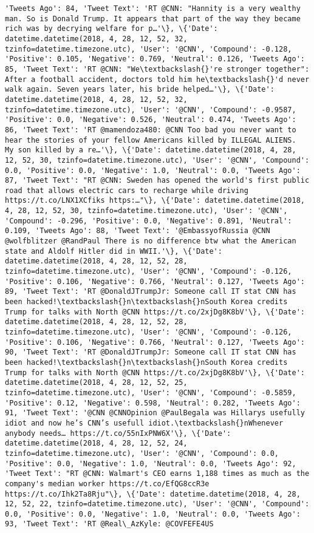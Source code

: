 \documentclass[11pt]{article}
\begin{document}
\begin{Verbatim}[commandchars=\\\{\}]
'Tweets Ago': 84, 'Tweet Text': 'RT @CNN: "Hannity is a very wealthy man. So is Donald Trump. It appears that part of the way they became rich was by decrying welfare for p…'\}, \{'Date': datetime.datetime(2018, 4, 28, 12, 52, 32, tzinfo=datetime.timezone.utc), 'User': '@CNN', 'Compound': -0.128, 'Positive': 0.105, 'Negative': 0.769, 'Neutral': 0.126, 'Tweets Ago': 85, 'Tweet Text': 'RT @CNN: "We\textbackslash{}'re stronger together": After a football accident, doctors told him he\textbackslash{}'d never walk again. Seven years later, his bride helped…'\}, \{'Date': datetime.datetime(2018, 4, 28, 12, 52, 32, tzinfo=datetime.timezone.utc), 'User': '@CNN', 'Compound': -0.9587, 'Positive': 0.0, 'Negative': 0.526, 'Neutral': 0.474, 'Tweets Ago': 86, 'Tweet Text': 'RT @mamendoza480: @CNN Too bad you never want to hear the stories of your fellow Americans killed by ILLEGAL ALIENS.  My son killed by a re…'\}, \{'Date': datetime.datetime(2018, 4, 28, 12, 52, 30, tzinfo=datetime.timezone.utc), 'User': '@CNN', 'Compound': 0.0, 'Positive': 0.0, 'Negative': 1.0, 'Neutral': 0.0, 'Tweets Ago': 87, 'Tweet Text': "RT @CNN: Sweden has opened the world's first public road that allows electric cars to recharge while driving https://t.co/LNX1XCfiks https:…"\}, \{'Date': datetime.datetime(2018, 4, 28, 12, 52, 30, tzinfo=datetime.timezone.utc), 'User': '@CNN', 'Compound': -0.296, 'Positive': 0.0, 'Negative': 0.891, 'Neutral': 0.109, 'Tweets Ago': 88, 'Tweet Text': '@EmbassyofRussia @CNN @wolfblitzer @RandPaul There is no difference btw what the American state and Aldolf Hitler did in WWII.'\}, \{'Date': datetime.datetime(2018, 4, 28, 12, 52, 28, tzinfo=datetime.timezone.utc), 'User': '@CNN', 'Compound': -0.126, 'Positive': 0.106, 'Negative': 0.766, 'Neutral': 0.127, 'Tweets Ago': 89, 'Tweet Text': 'RT @DonaldJTrumpJr: Someone call IT stat CNN has been hacked!\textbackslash{}n\textbackslash{}nSouth Korea credits Trump for talks with North @CNN https://t.co/2xjDg8K8bV'\}, \{'Date': datetime.datetime(2018, 4, 28, 12, 52, 28, tzinfo=datetime.timezone.utc), 'User': '@CNN', 'Compound': -0.126, 'Positive': 0.106, 'Negative': 0.766, 'Neutral': 0.127, 'Tweets Ago': 90, 'Tweet Text': 'RT @DonaldJTrumpJr: Someone call IT stat CNN has been hacked!\textbackslash{}n\textbackslash{}nSouth Korea credits Trump for talks with North @CNN https://t.co/2xjDg8K8bV'\}, \{'Date': datetime.datetime(2018, 4, 28, 12, 52, 25, tzinfo=datetime.timezone.utc), 'User': '@CNN', 'Compound': -0.5859, 'Positive': 0.12, 'Negative': 0.598, 'Neutral': 0.282, 'Tweets Ago': 91, 'Tweet Text': '@CNN @CNNOpinion @PaulBegala was Hillarys usefully  idiot and now he’s CNN’s usefull idiot.\textbackslash{}nWhenever anybody needs… https://t.co/55nIxPNW6X'\}, \{'Date': datetime.datetime(2018, 4, 28, 12, 52, 24, tzinfo=datetime.timezone.utc), 'User': '@CNN', 'Compound': 0.0, 'Positive': 0.0, 'Negative': 1.0, 'Neutral': 0.0, 'Tweets Ago': 92, 'Tweet Text': "RT @CNN: Walmart's CEO earns 1,188 times as much as the company's median worker https://t.co/EfQG8ccR3e https://t.co/Ihk2Ta8Rju"\}, \{'Date': datetime.datetime(2018, 4, 28, 12, 52, 22, tzinfo=datetime.timezone.utc), 'User': '@CNN', 'Compound': 0.0, 'Positive': 0.0, 'Negative': 1.0, 'Neutral': 0.0, 'Tweets Ago': 93, 'Tweet Text': 'RT @Real\_AzKyle: @COVFEFE4US 
\end{Verbatim}
\end{document}

